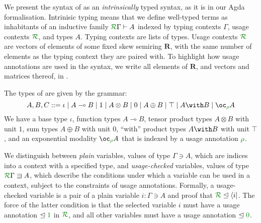 \documentclass[submission,copyright,creativecommons]{eptcs}
\begin{document}
We present the syntax of \name{} as an \emph{intrinsically} typed
syntax, as it is in our Agda formalisation. Intrinisic typing means
that we define well-typed terms as inhabitants of an inductive family
$\ctx\Gamma{R} \vdash A$ indexed by typing contexts $\Gamma$, usage
contexts $\resctx{R}$, and types $A$. Typing contexts are lists of
types. Usage contexts $\resctx{R}$ are vectors of elements of some
fixed skew semiring $\mathbf R$, with the same number of elements as
the typing context they are paired with. To highlight how usage
annotations are used in the syntax, we write all elements of
$\mathbf R$, and vectors and matrices thereof, in .



The types of \name{} are given by the grammar:
\begin{displaymath}
  A,B,C ::= \iota \mid A \multimap B \mid 1 \mid A \otimes B \mid 0 \mid A \oplus B \mid \top \mid A \with B \mid \excl{\rho} A
\end{displaymath}
We have a base type $\iota$, function types $A \multimap B$, tensor
product types $A \otimes B$ with unit $1$, sum types $A \oplus B$ with
unit $0$, ``with'' product types $A \with B$ with unit $\top$, and an
exponential modality $\excl{\rho} A$ that is indexed by a usage
annotation $\rescomment{\rho}$.

We distinguish between \emph{plain} variables, values of type
$\Gamma \ni A$, which are indices into a context with a specified
type, and \emph{usage-checked} variables, values of type
$\ctx{\Gamma}{R} \lvar A$, which describe the conditions under which a
variable can be used in a context, subject to the constraints of usage
annotations. Formally, a usage-checked variable is a pair of a plain
variable $i : \Gamma \ni A$ and proof that
$\resctx R \subres \langle i \rvert$. The force of the latter
condition is that the selected variable $i$ must have a usage
annotation $\subres \rescomment 1$ in $\resctx{R}$, and all other
variables must have a usage annotation $\subres \rescomment 0$.

\end{document}
